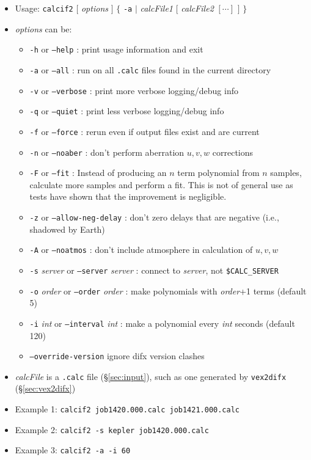\begin{itemize}
\item[] Usage: {\tt calcif2} $[$ {\em options} $]$ $\{$ {\tt -a} $\mid$ {\em calcFile1} $[$ {\em calcFile2} $[\cdots]$ $]$ $\}$
\item[] {\em options} can be:
\begin{itemize}
\item[] {\tt -h} or {\tt --help} : print usage information and exit
\item[] {\tt -a} or {\tt --all} : run on all {\tt .calc} files found in the current directory
\item[] {\tt -v} or {\tt --verbose} : print more verbose logging/debug info
\item[] {\tt -q} or {\tt --quiet} : print less verbose logging/debug info
\item[] {\tt -f} or {\tt --force} : rerun even if output files exist and are current
\item[] {\tt -n} or {\tt --noaber} : don't perform aberration $u,v,w$ corrections
\item[] {\tt -F} or {\tt --fit} : Instead of producing an $n$ term polynomial from $n$ samples, calculate more samples and perform a fit.  This is not of general use as tests have shown that the improvement is negligible.
\item[] {\tt -z} or {\tt --allow-neg-delay} : don't zero delays that are negative (i.e., shadowed by Earth)
\item[] {\tt -A} or {\tt --noatmos} : don't include atmosphere in calculation of $u,v,w$
\item[] {\tt -s} {\em server} or {\tt --server} {\em server} : connect to {\em server}, not {\tt \$CALC\_SERVER}
\item[] {\tt -o} {\em order} or {\tt --order} {\em order} : make polynomials with {\em order}+1 terms (default 5)  
\item[] {\tt -i} {\em int} or {\tt --interval} {\em int} : make a polynomial every {\em int} seconds (default 120)
\item[] {\tt --override-version} ignore difx version clashes
\end{itemize}
\item[] {\em calcFile} is a {\tt .calc} file (\S\ref{sec:input}), such as one generated by {\tt vex2difx} (\S\ref{sec:vex2difx})
\item[] Example 1: {\tt calcif2 job1420.000.calc job1421.000.calc} 
\item[] Example 2: {\tt calcif2 -s kepler job1420.000.calc}
\item[] Example 3: {\tt calcif2 -a -i 60} 
\end{itemize}







